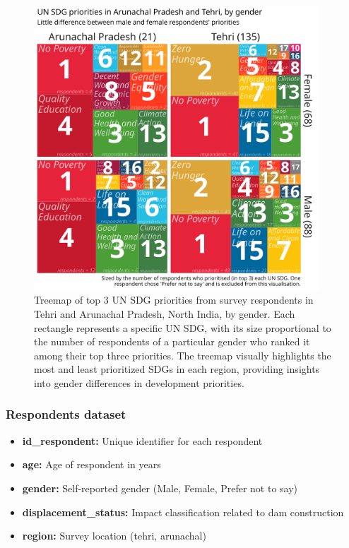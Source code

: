\begin{figure}[ht]
  \centering
  \includegraphics[width=0.95\textwidth]{../figures_and_tables/top3-gender-treemap.png}
  \caption[UN SDG priorities by gender]{\label{fig:top3-gender-treemap} Treemap of top 3 UN SDG priorities from survey respondents in Tehri and Arunachal Pradesh, North India, by gender. Each rectangle represents a specific UN SDG, with its size proportional to the number of respondents of a particular gender who ranked it among their top three priorities. The treemap visually highlights the most and least prioritized SDGs in each region, providing insights into gender differences in development priorities.}
\end{figure}

\subsubsection{Respondents dataset}

\begin{itemize}
  \item \textbf{id\_respondent:} Unique identifier for each respondent
  \item \textbf{age:} Age of respondent in years
  \item \textbf{gender:} Self-reported gender (Male, Female, Prefer not to say)
  \item \textbf{displacement\_status:} Impact classification related to dam construction
  \item \textbf{region:} Survey location (tehri, arunachal)
\end{itemize}


